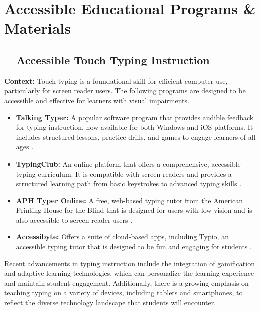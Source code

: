 \chapter{Accessible Educational Programs \& Materials}\label{app4:instructional-programs}

\section{~~Accessible Touch Typing Instruction}\label{app4:typing-instruction}

\noindent
\textbf{Context:} Touch typing is a foundational skill for efficient computer use, particularly for screen reader users. The following programs are designed to be accessible and effective for learners with visual impairments.

\begin{itemize}
	\item \textbf{Talking Typer:} A popular software program that provides audible feedback for typing instruction, now available for both Windows and iOS platforms. It includes structured lessons, practice drills, and games to engage learners of all ages \cite{TypeAbility2025}.
	\item \textbf{TypingClub:} An online platform that offers a comprehensive, accessible typing curriculum. It is compatible with screen readers and provides a structured learning path from basic keystrokes to advanced typing skills \cite{TypingClub2025}.
	\item \textbf{APH Typer Online:} A free, web-based typing tutor from the American Printing House for the Blind that is designed for users with low vision and is also accessible to screen reader users \cite{APH2025}.
	\item \textbf{Accessibyte:} Offers a suite of cloud-based apps, including Typio, an accessible typing tutor that is designed to be fun and engaging for students \cite{Typio2025}.
\end{itemize}

Recent advancements in typing instruction include the integration of gamification and adaptive learning technologies, which can personalize the learning experience and maintain student engagement. Additionally, there is a growing emphasis on teaching typing on a variety of devices, including tablets and smartphones, to reflect the diverse technology landscape that students will encounter.

